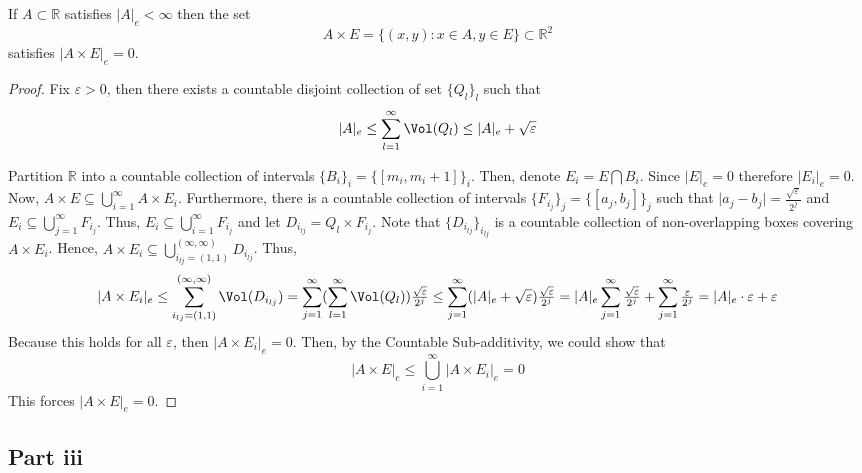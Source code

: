 \begin{question}
    If $A \subset \mathbb{R}$ satisfies $|A|_e<\infty$ then the set
    $$
    A \times E=\{(x, y): x \in A, y \in E\} \subset \mathbb{R}^2
    $$
    satisfies $|A \times E|_e=0$.
\end{question}

\begin{answer}
    \begin{proof}
        Fix $\varepsilon > 0$, then there exists a countable disjoint collection of set $\{Q_l\}_l$ such that $$\lvert A \rvert_e \leq \sum_{l = 1}^{\infty} \Vol(Q_l) \leq \lvert A \rvert_e + \sqrt{\varepsilon}$$
        
        Partition $\mathbb{R}$ into a countable collection of intervals $\{B_i\}_i = \{[m_i,m_i+1]\}_i$. Then, denote $E_i = E\bigcap B_i$. Since $\lvert E \rvert_e = 0$ therefore $\lvert E_i \rvert_e = 0$. Now, $A \times E \subseteq \bigcup_{i=1}^{\infty}A \times E_i$. Furthermore, there is a countable collection of intervals $\{F_{i_j}\}_j = \{[a_j,b_j]\}_j$ such that $\lvert a_j - b_j \rvert = \tfrac{\sqrt{\varepsilon}}{2^{j}}$ and $E_i \subseteq \bigcup_{j=1}^{\infty}F_{i_j}$. Thus, $E_i \subseteq \bigcup_{i =1}^{\infty} F_{i_j}$ and let $D_{i_{lj}} = Q_l \times F_{i_j}$. Note that $\{D_{i_{lj}}\}_{i_{lj}}$ is a countable collection of non-overlapping boxes covering $A\times E_i$. Hence, $A \times E_i \subseteq \bigcup_{i_{lj} = (1,1)}^{(\infty,\infty)} D_{i_{lj}}$. Thus,
        \begin{equation}
            \lvert A \times E_i \rvert_e \leq \sum_{i_{lj} = (1,1)}^{(\infty,\infty)} \Vol(D_{i_{lj}}) = \sum_{j=1}^{\infty}(\sum_{l = 1}^{\infty} \Vol(Q_l))\tfrac{\sqrt{\varepsilon}}{2^{j}} \leq \sum_{j=1}^{\infty}(\lvert A \rvert_e + \sqrt{\varepsilon})\tfrac{\sqrt{\varepsilon}}{2^j} = \lvert A \rvert_e \sum_{j=1}^{\infty}\tfrac{\sqrt{\varepsilon}}{2^j} + \sum_{j=1}^{\infty}\tfrac{\varepsilon}{2^j} = \lvert A \rvert_e\cdot \varepsilon + \varepsilon
        \end{equation}
        Because this holds for all $\varepsilon$, then $\lvert A \times E_i \rvert_e = 0$. Then, by the Countable Sub-additivity, we could show that
        $$\lvert A \times E \rvert_e \leq \bigcup_{i=1}^{\infty}\lvert A \times E_i \rvert_e = 0$$
        This forces $\lvert A \times E \rvert_e = 0$.
    \end{proof}
\end{answer}

\subsection{Part iii}

